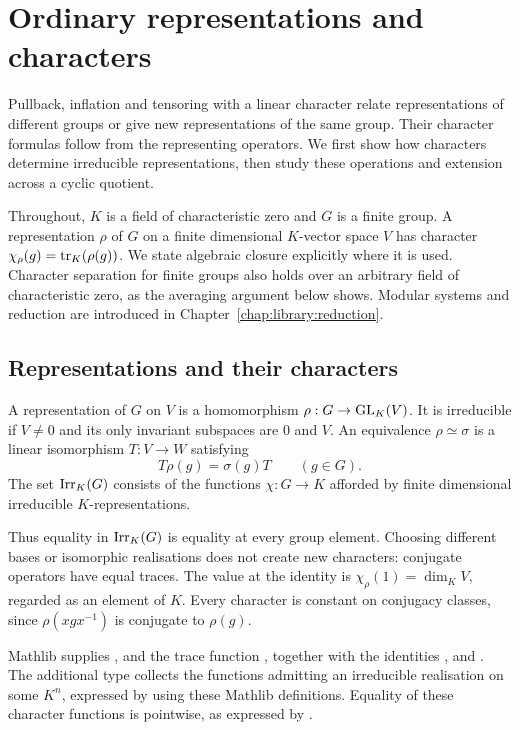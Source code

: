 \chapter{Ordinary representations and characters}
\label{chap:library:characters}

Pullback, inflation and tensoring with a linear character relate
representations of different groups or give new representations of the
same group. Their character formulas follow from the representing
operators. We first show how characters determine irreducible
representations, then study these operations and extension across a
cyclic quotient.

Throughout, $K$ is a field of characteristic zero and $G$ is a finite group.
A representation $\rho$ of $G$ on a finite dimensional $K$-vector space $V$
has character $\chi_\rho(g)=\operatorname{tr}_K(\rho(g))$. We state algebraic closure
explicitly where it is used. Character separation for finite groups
also holds over an arbitrary field of characteristic zero, as the
averaging argument below shows. Modular systems and reduction are
introduced in Chapter~\ref{chap:library:reduction}.

\section{Representations and their characters}
\label{lib:ordinary:realisations}

\begin{definition}
A representation of $G$ on $V$ is a homomorphism
$\rho:G\to\operatorname{GL}_K(V)$. It is irreducible if $V\ne0$ and its only invariant
subspaces are $0$ and $V$. An equivalence $\rho\simeq\sigma$ is a linear
isomorphism $T:V\to W$ satisfying
\[
 T\rho(g)=\sigma(g)T\qquad(g\in G).
\]
The set $\operatorname{Irr}_K(G)$ consists of the functions $\chi:G\to K$ afforded by
finite dimensional irreducible $K$-representations.
\end{definition}

Thus equality in $\operatorname{Irr}_K(G)$ is equality at every group element. Choosing
different bases or isomorphic realisations does not create new characters:
conjugate operators have equal traces. The value at the identity is
$\chi_\rho(1)=\dim_K V$, regarded as an element of $K$. Every character is
constant on conjugacy classes, since $\rho(xgx^{-1})$ is conjugate to
$\rho(g)$.

\begin{implementation}
Mathlib supplies ,
 and the trace function
, together with the identities
,  and
.
The additional type 
collects the functions admitting an irreducible realisation on some
$K^n$, expressed by
 using these
Mathlib definitions. Equality of these character functions is pointwise,
as expressed by
.
\end{implementation}


